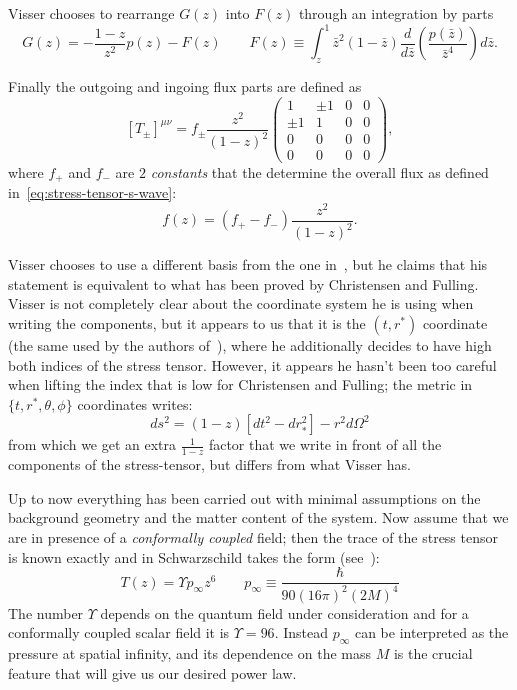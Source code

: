Visser chooses to rearrange \(G(z)\) into \(F(z)\) through an integration by parts
\[
G(z) = - \frac{1 - z}{z^2}p(z) - F(z) \quad \quad F(z) \equiv \int_z^1 \bar{z}^2(1 - \bar{z})\frac{d}{d\bar{z}}\left(\frac{p(\bar{z})}{\bar{z}^4}\right) d\bar{z}.   
\]

Finally the outgoing and ingoing flux parts are defined as 
\[
    \left[T_{\pm}\right]^{\mu\nu} = f_{\pm} \frac{z^2}{(1 - z)^2}
    \begin{pmatrix}
        1 & \pm 1 & 0 & 0 \\
        \pm 1 & 1 & 0 & 0 \\
        0 & 0 & 0 & 0 \\
        0 & 0 & 0 & 0
    \end{pmatrix},
\]
where \(f_+\) and \(f_-\) are \(2\) \emph{constants} that the determine the overall flux as defined in~\eqref{eq:stress-tensor-s-wave}:
\[
f(z) = \left(f_+ - f_-\right) \frac{z^2}{(1 - z)^2}. 
\]
\begin{remark}
    Visser chooses to use a different basis from the one  in~\cite[]{christensen1977trace}, but he claims that his statement is equivalent to what has been proved by Christensen and Fulling. Visser is not completely clear about the coordinate system he is using when writing the components, but it appears to us that it is the \((t, r^*)\) coordinate (the same used by the authors of~\cite[]{christensen1977trace}), where he additionally decides to have high both indices of the stress tensor. However, it appears he hasn't been too careful when lifting the index that is low for Christensen and Fulling; the metric in \(\{t, r^*, \theta, \phi\}\) coordinates writes:
    \[
    ds^2 = (1 - z) \left[dt^2 - dr_*^2\right]  -r^2d\Omega^2  
    \]
    from which we get an extra \(\frac{1}{1-z}\) factor that we write in front of all the components of the stress-tensor, but differs from what Visser has.
\end{remark}

Up to now everything has been carried out with minimal assumptions on the background geometry and the matter content of the system. Now assume that we are in presence of a \emph{conformally coupled} field; then the trace of the stress tensor is known exactly and in Schwarzschild takes the form (see~\cite{birrell1984quantum}):
\[
T(z) = \Upsilon p_{\infty}z^6 \quad \quad p_{\infty} \equiv \frac{\hbar}{90(16\pi)^2(2M)^4}   
\]
The number \(\Upsilon\) depends on the quantum field under consideration and for a conformally coupled scalar field it is \(\Upsilon = 96\). Instead \(p_{\infty}\) can be interpreted as the pressure at spatial infinity, and its dependence on the mass \(M\) is the crucial feature that will give us our desired power law.


